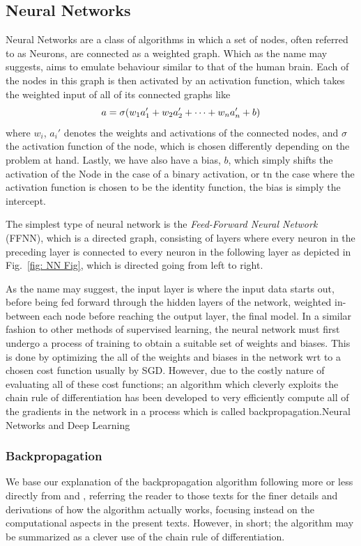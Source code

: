 \documentclass[reprint, english, nofootinbib]{revtex4-2}
\begin{document}
\subsection{Neural Networks}
\noindent
Neural Networks are a class of algorithms in which a set of nodes, often referred to as Neurons, are connected as a weighted graph. Which as the name may suggests, aims to emulate behaviour similar to that of the human brain. Each of the nodes in this graph is then activated by an activation function, which takes the weighted input of all of its connected graphs like
\begin{equation}
    a = \sigma\qty(w_1 a_1' + w_2 a_2' + \dots + w_n a_n' + b)
\end{equation}
where $w_i$, $a_i'$ denotes the weights and activations of the connected nodes, and $\sigma$ the activation function of the node, which is chosen differently depending on the problem at hand. Lastly, we have also have a bias, $b$, which simply shifts the activation of the Node in the case of a binary activation, or tn the case where the activation function is chosen to be the identity function, the bias is simply the intercept.

The simplest type of neural network is the \textit{Feed-Forward Neural Network} (FFNN), which is a directed graph, consisting of layers where every neuron in the preceding layer is connected to every neuron in the following layer as depicted in Fig.~\ref{fig: NN Fig}, which is directed going from left to right.

As the name may suggest, the input layer is where the input data starts out, before being fed forward through the hidden layers of the network, weighted in-between each node before reaching the output layer, the final model. In a similar fashion to other methods of supervised learning, the neural network must first undergo a process of training to obtain a suitable set of weights and biases. This is done by optimizing the all of the weights and biases in the network wrt to a chosen cost function usually by SGD. However, due to the costly nature of evaluating all of these cost functions; an algorithm which cleverly exploits the chain rule of differentiation has been developed to very efficiently compute all of the gradients in the network in a process which is called backpropagation.Neural Networks and Deep Learning

\subsubsection{Backpropagation}
\noindent
We base our explanation of the backpropagation algorithm following more or less directly from \textcite{Nielsen} and \textcite{Mehta_2019}, referring the reader to those texts for the finer details and derivations of how the algorithm actually works, focusing instead on the computational aspects in the present texts. However, in short; the algorithm may be summarized as a clever use of the chain rule of differentiation.
\end{document}
